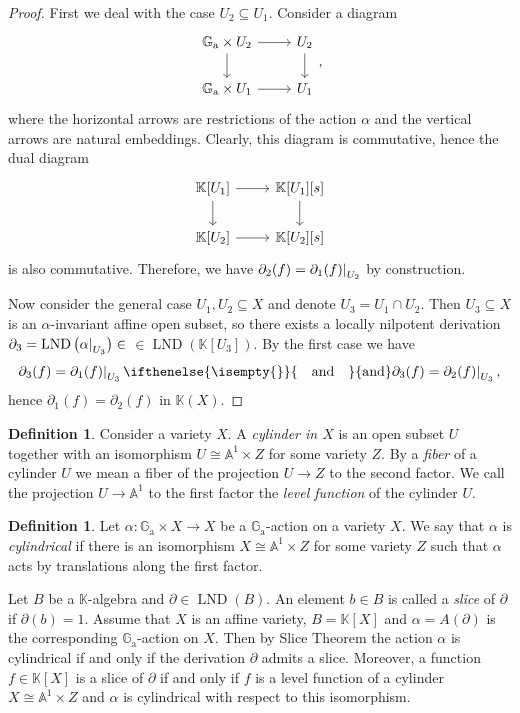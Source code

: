 \documentclass[a4paper, 12pt, reqno]{amsart}
\newcommand{\bb}{\mathbb}
\newcommand{\der}{\partial}
\newcommand{\Ga}{\bb{G}_\mathrm{a}}
\DeclareMathOperator{\LND}{LND}
\newcommand{\insertText}[2][]{%
    \ifthenelse{\isempty{#1}}{%
        \quad \text{#2} \quad%
    }{%
        #1 \text{#2} #1%
    }%
}
\newcommand{\restrict}[2]{
    \left.
    \kern-\nulldelimiterspace{#1}
    \right|_{#2}
}
\theoremstyle{definition}
\newtheorem{defi}[counter]{Definition}
\theoremstyle{plain}
\begin{document}
\begin{proof}
First we deal with the case $U_2 \subseteq U_1$. Consider a diagram
$$
\begin{tikzcd}
\Ga \times U_2 \ar{r} \ar{d} & U_2 \ar{d}
\\
\Ga \times U_1 \ar{r} & U_1
\end{tikzcd}
,
$$
where the horizontal arrows are restrictions of the action $\alpha$ and the vertical arrows are natural embeddings. Clearly, this diagram is commutative, hence the dual diagram
$$
\begin{tikzcd}
\bb{K}[U_1] \ar{r} \ar{d} & \bb{K}[U_1][s] \ar{d}
\\
\bb{K}[U_2] \ar{r} & \bb{K}[U_2][s]
\end{tikzcd}
$$
is also commutative. Therefore, we have $\der_2(f) = \restrict{\der_1(f)}{U_2}$ by construction.

Now consider the general case $U_1, U_2 \subseteq X$ and denote $U_3 = U_1 \cap U_2$. Then $U_3 \subseteq X$ is an
\linebreak
$\alpha$-invariant affine open subset, so there exists a locally nilpotent derivation $\der_3 = \LND \left( \restrict{\alpha}{U_3} \right) \in$
\linebreak
$\in \LND(\bb{K}[U_3])$. By the first case we have
$$
\der_3(f) = \restrict{\der_1(f)}{U_3}
\insertText{and}
\der_3(f) = \restrict{\der_2(f)}{U_3},
$$
hence $\der_1(f) = \der_2(f)$ in $\bb{K}(X)$.
\end{proof}

\begin{defi}
Consider a variety $X$. A \emph{cylinder in $X$} is an open subset $U$ together with an isomorphism $U \cong \bb{A}^1 \times Z$ for some variety $Z$. By a \emph{fiber} of a cylinder $U$ we mean a fiber of the projection $U \to Z$ to the second factor. We call the projection $U \to \bb{A}^1$ to the first factor the \emph{level function} of the cylinder $U$.
\end{defi}

\begin{defi}
Let $\alpha \colon \Ga \times X \to X$ be a $\Ga$-action on a variety $X$. We say that $\alpha$ is \emph{cylindrical} if there is an isomorphism $X \cong \bb{A}^1 \times Z$ for some variety $Z$ such that $\alpha$ acts by translations along the first factor.
\end{defi}

Let $B$ be a $\bb{K}$-algebra and $\der \in \LND(B)$. An element $b \in B$ is called a \emph{slice} of $\der$ if $\der(b) = 1$. Assume that $X$ is an affine variety, $B = \bb{K}[X]$ and $\alpha = A(\der)$ is the corresponding $\Ga$-action on $X$. Then by Slice Theorem \cite[Corollary~1.26]{Fr17} the action $\alpha$ is cylindrical if and only if the derivation $\der$ admits a slice. Moreover, a function $f \in \bb{K}[X]$ is a slice of $\der$ if and only if $f$ is a level function of a cylinder $X \cong \bb{A}^1 \times Z$ and $\alpha$ is cylindrical with respect to this isomorphism.
\end{document}
